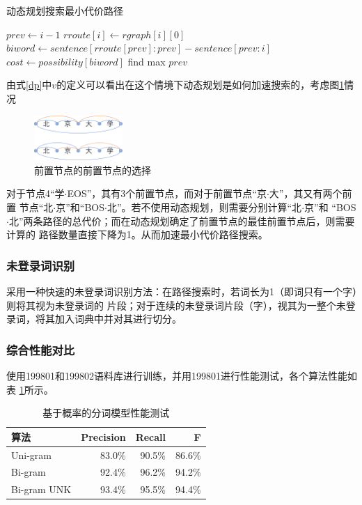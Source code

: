 \begin{algorithm}
  \caption{动态规划搜索最小代价路径}
  \begin{algorithmic}
    \STATE $prev \gets i-1$
    \STATE $rroute[i] \gets rgraph[i][0]$
    \ELSE
    \STATE $biword \gets sentence[rroute[prev]:prev]-sentence[prev:i]$
    \STATE $cost \gets possibility[biword]$
    \ENDFOR
    \STATE find max $prev$
    \ENDIF
    \ENDFOR
  \end{algorithmic}
  \label{dp_alg}
\end{algorithm}

由式\ref{dp}中$v$的定义可以看出在这个情境下动态规划是如何加速搜索的，考虑图\ref{p6}情况

\begin{figure}[H]
  \centering
  \includegraphics[width=0.3\textwidth]{figures/figure_08.png}
  \caption{前置节点的前置节点的选择}
  \label{p6}
\end{figure}

对于节点4“学$\cdot$EOS”，其有3个前置节点，而对于前置节点“京$\cdot$大”，其又有两个前置
节点“北$\cdot$京”和“BOS$\cdot$北”。若不使用动态规划，则需要分别计算“北$\cdot$京”和
“BOS$\cdot$北”两条路径的总代价；而在动态规划确定了前置节点的最佳前置节点后，则需要计算的
路径数量直接下降为1。从而加速最小代价路径搜索。

\subsubsection{未登录词识别}

采用一种快速的未登录词识别方法：在路径搜索时，若词长为1（即词只有一个字）则将其视为未登录词的
片段；对于连续的未登录词片段（字），视其为一整个未登录词，将其加入词典中并对其进行切分。

\subsubsection{综合性能对比}

使用199801和199802语料库进行训练，并用199801进行性能测试，各个算法性能如表
\ref{seg_evaluate2}所示。

\begin{table}[H]
  \centering
  \begin{tabular}{lrrr}
    \hline
    \textbf{算法} & \textbf{Precision} & \textbf{Recall} & \textbf{F} \\
    \hline
    Uni-gram      & 83.0\%             & 90.5\%          & 86.6\%     \\
    Bi-gram       & 92.4\%             & 96.2\%          & 94.2\%     \\
    Bi-gram UNK   & 93.4\%             & 95.5\%          & 94.4\%     \\
    \hline
  \end{tabular}
  \caption{基于概率的分词模型性能测试}
  \label{seg_evaluate2}
\end{table}

